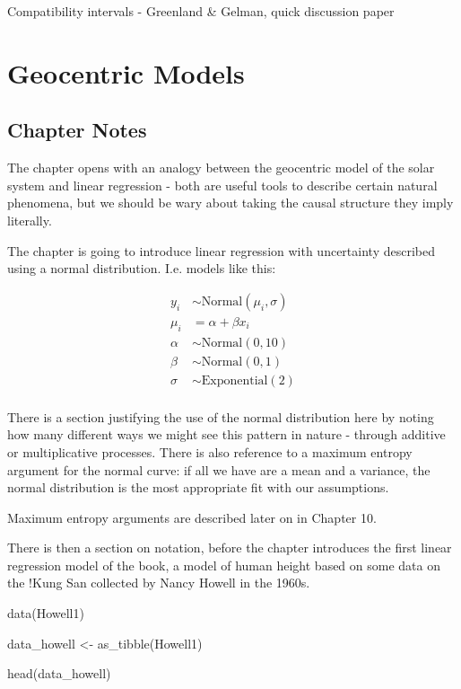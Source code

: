 \documentclass[
]{book}
\newenvironment{Shaded}{\begin{snugshade}}{\end{snugshade}}
\newcommand{\FunctionTok}[1]{\textcolor[rgb]{0.00,0.00,0.00}{#1}}
\newcommand{\NormalTok}[1]{#1}
\newcommand{\OtherTok}[1]{\textcolor[rgb]{0.56,0.35,0.01}{#1}}
\begin{document}
Compatibility intervals - Greenland \& Gelman, quick discussion paper

\hypertarget{geocentric}{%
\chapter{Geocentric Models}\label{geocentric}}

\hypertarget{chapter-notes-3}{%
\section{Chapter Notes}\label{chapter-notes-3}}

The chapter opens with an analogy between the geocentric model of the solar system and linear regression - both are useful tools to describe certain natural phenomena, but we should be wary about taking the causal structure they imply literally.

The chapter is going to introduce linear regression with uncertainty described using a normal distribution. I.e. models like this:

\[
\begin{aligned}
y_i &\sim \text{Normal}(\mu_i, \sigma) \\
\mu_i &= \alpha + \beta x_i \\
\alpha &\sim \text{Normal}(0, 10) \\ 
\beta &\sim \text{Normal}(0, 1) \\
\sigma &\sim \text{Exponential}(2) \\
\end{aligned}
\]

There is a section justifying the use of the normal distribution here by noting how many different ways we might see this pattern in nature - through additive or multiplicative processes. There is also reference to a maximum entropy argument for the normal curve: if all we have are a mean and a variance, the normal distribution is the most appropriate fit with our assumptions.

Maximum entropy arguments are described later on in Chapter 10.

There is then a section on notation, before the chapter introduces the first linear regression model of the book, a model of human height based on some data on the !Kung San collected by Nancy Howell in the 1960s.

\begin{Shaded}
\begin{Highlighting}[]
\FunctionTok{data}\NormalTok{(Howell1) }

\NormalTok{data\_howell }\OtherTok{\textless{}{-}} \FunctionTok{as\_tibble}\NormalTok{(Howell1)}

\FunctionTok{head}\NormalTok{(data\_howell)}
\end{Highlighting}
\end{Shaded}
\end{document}
